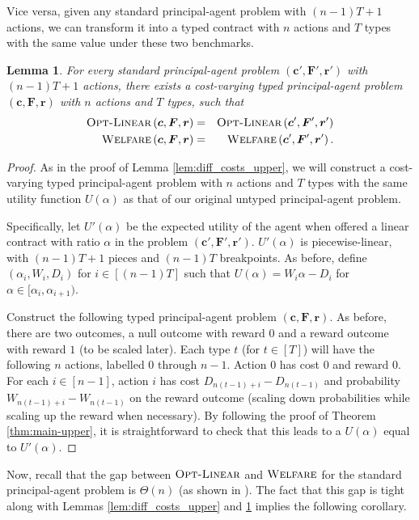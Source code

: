 \documentclass{article}
\newtheorem{lemma}[theorem]{Lemma}
\newcommand{\costvector}{\bm{c}}
\newcommand{\ForecastTensor}{\bm{F}}
\newcommand{\rewardvector}{\bm{r}}
\newcommand{\PrincipalAgentProblem}{\left(\costvector, \ForecastTensor, \rewardvector\right)}
\newcommand{\PrincipalAgentProblemPrime}{\left(\costvector', \ForecastTensor', \rewardvector'\right)}
\newcommand{\OWelfare}{\textsc{Welfare}}
\newcommand{\OLinear}{\textsc{Opt-Linear}}
\begin{document}
Vice versa, given any standard principal-agent problem with $(n-1)T + 1$ actions, we can transform it into a typed contract with $n$ actions and $T$ types with the same value under these two benchmarks.

\begin{lemma}\label{lem:diff_costs_lower}
For every standard principal-agent problem $\PrincipalAgentProblemPrime$ with $(n-1)T+1$ actions, there exists a cost-varying typed principal-agent problem $\PrincipalAgentProblem$ with $n$ actions and $T$ types, such that
\begin{eqnarray*}
\OLinear \PrincipalAgentProblem &=& \OLinear \PrincipalAgentProblemPrime\\
\OWelfare \PrincipalAgentProblem &=& \OWelfare \PrincipalAgentProblemPrime.
\end{eqnarray*}
\end{lemma}
\begin{proof}
As in the proof of Lemma \ref{lem:diff_costs_upper}, we will construct a cost-varying typed principal-agent problem with $n$ actions and $T$ types with the same utility function $U(\alpha)$ as that of our original untyped principal-agent problem. 

Specifically, let $U'(\alpha)$ be the expected utility of the agent when offered a linear contract with ratio $\alpha$ in the problem $\PrincipalAgentProblemPrime$. $U'(\alpha)$ is piecewise-linear, with $(n-1)T + 1$ pieces and $(n-1)T$ breakpoints. As before, define $(\alpha_i, W_i, D_i)$ for $i \in [(n-1)T]$ such that $U(\alpha) = W_{i}\alpha - D_i$ for $\alpha \in [\alpha_i, \alpha_{i+1})$. 

Construct the following typed principal-agent problem $\PrincipalAgentProblem$. As before, there are two outcomes, a null outcome with reward 0 and a reward outcome with reward $1$ (to be scaled later). Each type $t$ (for $t \in [T]$) will have the following $n$ actions, labelled $0$ through $n-1$. Action $0$ has cost $0$ and reward $0$. For each $i \in [n-1]$, action $i$ has cost $D_{n(t-1) + i} - D_{n(t-1)}$ and probability $W_{n(t-1) + i} - W_{n(t-1)}$ on the reward outcome (scaling down probabilities while scaling up the reward when necessary). By following the proof of Theorem \ref{thm:main-upper}, it is straightforward to check that this leads to a $U(\alpha)$ equal to $U'(\alpha)$. 
\end{proof}

Now, recall that the gap between $\OLinear$ and $\OWelfare$ for the standard principal-agent problem is $\Theta(n)$ (as shown in \cite{dutting2019simple}). The fact that this gap is tight along with Lemmas \ref{lem:diff_costs_upper} and \ref{lem:diff_costs_lower} implies the following corollary.
\end{document}
